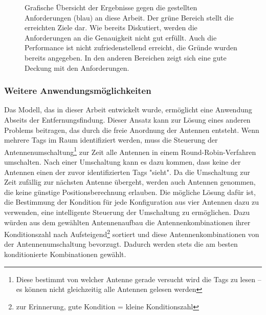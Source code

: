 \begin{figure}[ht!]
         \centering
         \caption[Anforderungsspinne]{ Grafische Übersicht der Ergebnisse gegen die gestellten Anforderungen (blau) an diese Arbeit. Der grüne Bereich stellt die erreichten Ziele dar. Wie bereits Diskutiert, werden die Anforderungen an die Genauigkeit nicht gut erfüllt. Auch die Performance ist nicht zufriedenstellend erreicht, die Gründe wurden bereits angegeben. In den anderen Bereichen zeigt sich eine gute Deckung mit den Anforderungen. }
         \vspace{2mm}
         \label{fig:Requirements_reached}
         
\end{figure}
%

\subsubsection{Weitere Anwendungsmöglichkeiten}
%
Das Modell, das in dieser Arbeit entwickelt wurde, ermöglicht eine Anwendung Abseits der Entfernungsfindung. Dieser Ansatz kann zur Lösung eines anderen Problems beitragen, das durch die freie Anordnung der Antennen entsteht. Wenn mehrere Tags im Raum identifiziert werden, muss die Steuerung der Antennenumschaltung\footnote{Diese bestimmt von welcher Antenne gerade versucht wird die Tags zu lesen -- es können nicht gleichzeitig alle Antennen gelesen werden} zur Zeit alle Antennen in einem Round-Robin-Verfahren umschalten. Nach einer Umschaltung kann es dazu kommen, dass keine der Antennen einen der zuvor identifizierten Tags "sieht". Da die Umschaltung zur Zeit zufällig zur nächsten Antenne übergeht, werden auch Antennen genommen, die keine günstige Positionsberechnung erlauben. Die mögliche Lösung dafür ist, die Bestimmung der Kondition für jede Konfiguration aus vier Antennen dazu zu verwenden, eine intelligente Steuerung der Umschaltung zu ermöglichen. Dazu würden aus dem gewählten Antennenaufbau die Antennenkombinationen ihrer Konditionszahl nach Aufsteigend\footnote{zur Erinnerung, gute Kondition = kleine Konditionszahl} sortiert und diese Antennenkombinationen von der Antennenumschaltung bevorzugt. Dadurch werden stets die am besten konditionierte Kombinationen gewählt.
%

